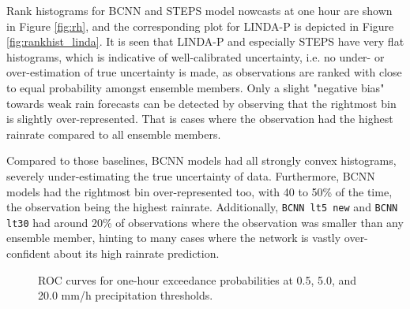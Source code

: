 Rank histograms for BCNN and STEPS model nowcasts at one hour are shown in Figure \ref{fig:rh}, and the corresponding plot for LINDA-P is depicted in Figure \ref{fig:rankhist_linda}. It is seen that LINDA-P and especially STEPS have very flat histograms, which is indicative of well-calibrated uncertainty, i.e. no under- or over-estimation of true uncertainty is made, as observations are ranked with close to equal probability amongst ensemble members. Only a slight "negative bias" towards weak rain forecasts can be detected by observing that the rightmost bin is slightly over-represented. That is cases where the observation had the highest rainrate compared to all ensemble members. 

Compared to those baselines, BCNN models had all strongly convex histograms, severely under-estimating the true uncertainty of data. Furthermore, BCNN models had the rightmost bin over-represented too, with 40 to 50\% of the time, the observation being the highest rainrate. Additionally, \texttt{BCNN lt5 new} and \texttt{BCNN lt30} had around 20\% of observations where the observation was smaller than any ensemble member, hinting to many cases where the network is vastly over-confident about its high rainrate prediction. 

\begin{figure}[H]
	
	\caption{ROC curves for one-hour exceedance probabilities at 0.5, 5.0, and 20.0 mm/h precipitation thresholds.}
	\label{fig:roc}
\end{figure}

